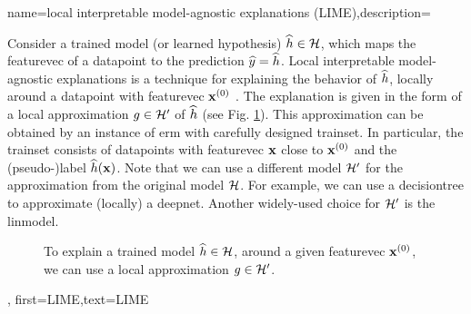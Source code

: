 {name={local interpretable model-agnostic explanations (LIME)},description={
		Consider 
		a trained \gls{model} (or learned \gls{hypothesis}) $\widehat{h} \in \mathcal{H}$, 
		which maps the \gls{featurevec} of a \gls{datapoint} to the \gls{prediction} $\widehat{y}= \widehat{h}$. 
		Local interpretable \gls{model}-agnostic \gls{explanation}s is a technique for explaining 
		the behavior of $\widehat{h}$, locally around a \gls{datapoint} with \gls{featurevec} ${\bf x}^{(0)}$ \cite{Ribeiro2016}. 
		The explanation is given in the form of a local approximation $g \in \mathcal{H}'$ of $\widehat{h}$ (see Fig. \ref{fig_lime}). 
		This approximation can be obtained by an instance of \gls{erm} with carefully designed 
		\gls{trainset}. In particular, the \gls{trainset} consists of \gls{datapoint}s with 
		\gls{featurevec} ${\bf x}$ close to ${\bf x}^{(0)}$ and the (pseudo-)label $\widehat{h}({\bf x})$. 
		Note that we can use a different \gls{model} $\mathcal{H}'$ for the approximation from 
		the original \gls{model} $\mathcal{H}$. For example, we can use a \gls{decisiontree} 
		to approximate (locally) a \gls{deepnet}. Another widely-used choice for $\mathcal{H}'$ is 
		the \gls{linmodel}. 
		\begin{figure}[H]
		\begin{center}
		\end{center}
		\caption{To explain a trained \gls{model} $\widehat{h} \in \mathcal{H}$, around a 
		given \gls{featurevec} ${\bf x}^{(0)}$, we can use a local approximation $g \in \mathcal{H}'$. }
		\label{fig_lime}
		\end{figure}},
	first={LIME},text={LIME}
}




